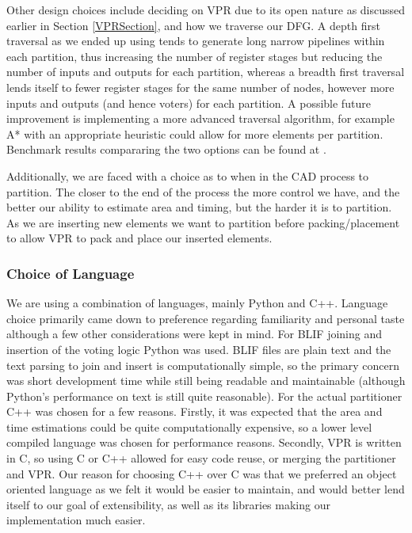 \documentclass[12pt,final,oneside]{dwThesis} %
\begin{document}
   Other design choices include deciding on \ac{VPR} due to its open nature as discussed earlier in Section \ref{VPRSection}, and how we traverse our \ac{DFG}. A depth first traversal as we ended up using tends to generate long narrow pipelines within each partition, thus increasing the number of register stages but reducing the number of inputs and outputs for each partition, whereas a breadth first traversal lends itself to fewer register stages for the same number of nodes, however more inputs and outputs (and hence voters) for each partition. A possible future improvement is implementing a more advanced traversal algorithm, for example A* with an appropriate heuristic could allow for more elements per partition. Benchmark results compararing the two options can be found at .

   Additionally, we are faced with a choice as to when in the \ac{CAD} process to partition. The closer to the end of the process the more control we have, and the better our ability to estimate area and timing, but the harder it is to partition. As we are inserting new elements we want to partition before packing/placement to allow \ac{VPR} to pack and place our inserted elements.

   \subsubsection{Choice of Language}
   We are using a combination of languages, mainly Python and C++. Language choice primarily came down to preference regarding familiarity and personal taste although a few other considerations were kept in mind.
   For \ac{BLIF} joining and insertion of the voting logic Python was used. \ac{BLIF} files are plain text and the text parsing to join and insert is computationally simple, so the primary concern was short development time while still being readable and maintainable (although Python's performance on text is still quite reasonable)\cite{LanguageBenchmark}.
   For the actual partitioner C++ was chosen for a few reasons. Firstly, it was expected that the area and time estimations could be quite computationally expensive, so a lower level compiled language was chosen for performance reasons\cite{LanguageBenchmark}. Secondly, \ac{VPR} is written in C, so using C or C++ allowed for easy code reuse, or merging the partitioner and \ac{VPR}. Our reason for choosing C++ over C was that we preferred an object oriented language as we felt it would be easier to maintain, and would better lend itself to our goal of extensibility, as well as its libraries making our implementation much easier.
\end{document}
